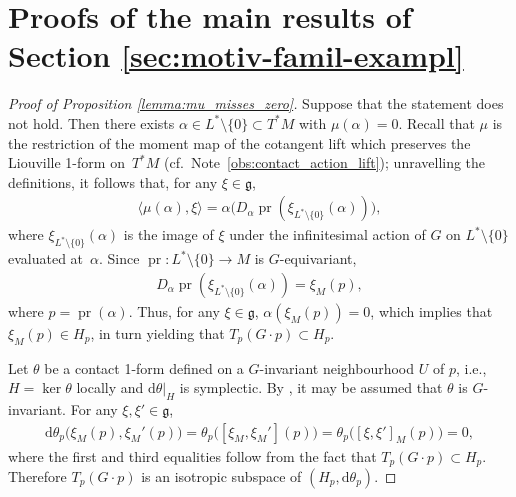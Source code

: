 \documentclass[10pt,a4paper]{amsart}
\numberwithin{equation}{section}
\newcommand{\de}{\mathrm{d}} %
\newcommand{\CM}{(M,H)} %
\newcommand{\SYM}{L^* \setminus \{0\}} %
\begin{document}
\section{Proofs of the main results of Section \ref{sec:motiv-famil-exampl}}\label{sec:proofs-sect-refs}

\begin{proof}[Proof of Proposition \ref{lemma:mu_misses_zero}] Suppose that the statement does not hold. Then there exists $\alpha \in \SYM \subset T^* M$ with $\mu(\alpha) = 0$. Recall that $\mu$ is the restriction of the moment map of the cotangent lift which preserves the Liouville 1-form on~$T^*M$ (cf.\ Note~\ref{obs:contact_action_lift}); unravelling the def\/initions, it follows that, for any $\xi \in \mathfrak{g}$,
\begin{gather*}
\langle \mu(\alpha), \xi \rangle = \alpha\big(D_{\alpha}\operatorname{pr} (\xi_{\SYM}(\alpha) )\big),
 \end{gather*}
where $\xi_{\SYM}(\alpha)$ is the image of $\xi$ under the inf\/initesimal action of $G$ on $\SYM$ evaluated at~$\alpha$. Since $\operatorname{pr} \colon \SYM \to M$ is $G$-equivariant,
 \begin{gather*}
 D_{\alpha}\operatorname{pr} (\xi_{\SYM}(\alpha) ) = \xi_M(p),
 \end{gather*}
where $p = \operatorname{pr}(\alpha)$. Thus, for any $\xi \in \mathfrak{g}$, $\alpha(\xi_M(p)) = 0$, which implies that $\xi_M(p) \in H_p$, in turn yielding that $T_p ( G \cdot p ) \subset H_p$.

Let $\theta$ be a contact 1-form def\/ined on a $G$-invariant neighbourhood $U$ of $p$, i.e., $H = \ker \theta$ locally and $\de \theta|_H$ is symplectic. By \cite[Lemma~2.6]{lerman_contact_toric}, it may be assumed that $\theta$ is $G$-invariant. For any $\xi, \xi' \in \mathfrak{g}$,
 \begin{gather*}
 \de \theta_p\big(\xi_M(p), \xi_M'(p) \big) = \theta_p \big([\xi_M , \xi_M'](p) \big) = \theta_p\big([\xi, \xi']_M (p)\big) = 0,
 \end{gather*}
 where the f\/irst and third equalities follow from the fact that $T_p(G \cdot p) \subset H_p$. Therefore $T_p(G \cdot p )$ is an isotropic subspace of $(H_p,\de \theta_p)$.


\end{proof}
\end{document}
